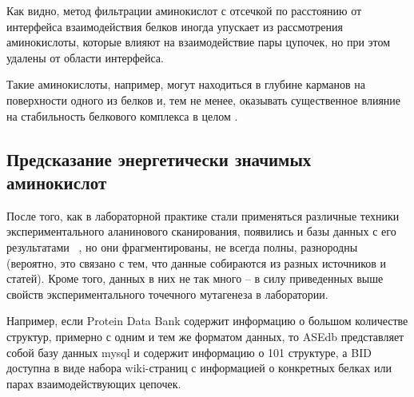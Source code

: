 Как видно, метод фильтрации аминокислот с отсечкой по расстоянию от интерфейса взаимодействия белков иногда упускает из рассмотрения аминокислоты, которые влияют на взаимодействие пары цупочек, но при этом удалены от области интерфейса.

Такие аминокислоты, например, могут находиться в глубине карманов на поверхности одного из белков и, тем не менее, оказывать существенное влияние на стабильность белкового комплекса в целом \cite{pockets2004}.

\subsection{Предсказание энергетически значимых аминокислот}





После того, как в лабораторной практике стали применяться различные техники экспериментального аланинового сканирования, появились и базы данных с его результатами ~\cite{asedb2001, bid2003}, но они фрагментированы, не всегда полны, разнородны (вероятно, это связано с тем, что данные собираются из разных источников и статей). Кроме того, данных в них не так много -- в силу приведенных выше свойств экспериментального точечного мутагенеза в лаборатории.

Например, если Protein Data Bank содержит информацию о большом количестве структур,  примерно с одним и тем же форматом данных, то ASEdb представляет собой базу данных mysql и содержит информацию о 101 структуре, а BID доступна в виде набора wiki-страниц с информацией о конкретных белках или парах взаимодействующих цепочек.

